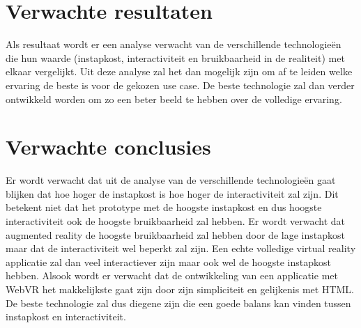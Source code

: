 \section{Verwachte resultaten}
\label{sec:verwachte_resultaten}

Als resultaat wordt er een analyse verwacht van de verschillende technologieën die hun waarde (instapkost, interactiviteit en bruikbaarheid in de realiteit) met elkaar vergelijkt. Uit deze analyse zal het dan mogelijk zijn om af te leiden welke ervaring de beste is voor de gekozen use case. De beste technologie zal dan verder ontwikkeld worden om zo een beter beeld te hebben over de volledige ervaring.

\section{Verwachte conclusies}
\label{sec:verwachte_conclusies}

Er wordt verwacht dat uit de analyse van de verschillende technologieën gaat blijken dat hoe hoger de instapkost is hoe hoger de interactiviteit zal zijn. Dit betekent niet dat het prototype met de hoogste instapkost en dus hoogste interactiviteit ook de hoogste bruikbaarheid zal hebben. Er wordt verwacht dat augmented reality de hoogste bruikbaarheid zal hebben door de lage instapkost maar dat de interactiviteit wel beperkt zal zijn. Een echte volledige virtual reality applicatie zal dan veel interactiever zijn maar ook wel de hoogste instapkost hebben. Alsook wordt er verwacht dat de ontwikkeling van een applicatie met WebVR het makkelijkste gaat zijn door zijn simpliciteit en gelijkenis met HTML. De beste technologie zal dus diegene zijn die een goede balans kan vinden tussen instapkost en interactiviteit.